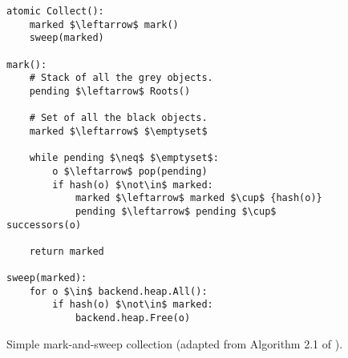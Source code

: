 \begin{figure}[!ht]
  \caption{Simple mark-and-sweep collection (adapted from Algorithm 2.1 of \cite{handbook}).}
  \label{alg:mark-sweep}

  \centering
  \begin{lstlisting}
atomic Collect():
    marked $\leftarrow$ mark()
    sweep(marked)

mark():
    # Stack of all the grey objects.
    pending $\leftarrow$ Roots()

    # Set of all the black objects.
    marked $\leftarrow$ $\emptyset$

    while pending $\neq$ $\emptyset$:
        o $\leftarrow$ pop(pending)
        if hash(o) $\not\in$ marked:
            marked $\leftarrow$ marked $\cup$ {hash(o)}
            pending $\leftarrow$ pending $\cup$ successors(o)

    return marked

sweep(marked):
    for o $\in$ backend.heap.All():
        if hash(o) $\not\in$ marked:
            backend.heap.Free(o)
\end{lstlisting}
\end{figure}
